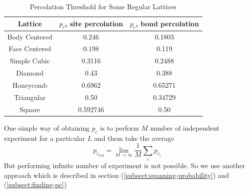 	\begin{table}[h]
		\centering
		\begin{tabular}{|c|c|c|}
			\hline
			Lattice & $p_c$, site percolation & $p_c$, bond percolation \\ 		\hline
			Body Centered & 0.246 & 0.1803 \\ 		\hline
			Face Centered & 0.198 &  0.119 \\ 		\hline
			Simple Cubic & 0.3116 & 0.2488 \\ 		\hline
			Diamond & 0.43 & 0.388 \\ 		\hline
			Honeycomb & 0.6962 & 0.65271 \\ 		\hline
			Triangular & 0.50 & 0.34729 \\ 		\hline
			Square & 0.592746 & 0.50 \\ 		\hline
		\end{tabular}
		\caption{Percolation Threshold for Some Regular Lattices}
		\label{tab:percolation-threshold}
	\end{table}
	One simple way of obtaining $p_c$ is to perform $M$ number of independent experiment for a particular $L$ and them take the average 
	\begin{equation}
		p_{c_{avg}} = \lim_{M\rightarrow\infty}\frac{1}{M} \sum_{i} p_{c_i}
	\end{equation}
	But performing infinite number of experiment is not possible. So we use another approach which is described in section (\ref{subsect:spanning-probability}) and (\ref{subsect:finding-pc})
	
	
	
